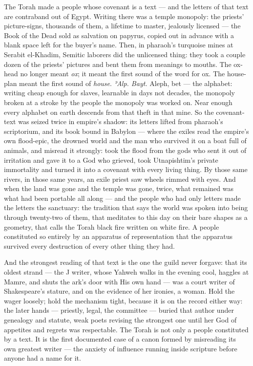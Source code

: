 The Torah made a people whose covenant is a text --- and the letters of
that text are contraband out of Egypt. Writing there was a temple
monopoly: the priests' picture-signs, thousands of them, a lifetime to
master, jealously licensed --- the Book of the Dead sold as salvation on
papyrus, copied out in advance with a blank space left for the buyer's
name. Then, in pharaoh's turquoise mines at Serabit el-Khadim, Semitic
laborers did the unlicensed thing: they took a couple dozen of the
priests' pictures and bent them from meanings to mouths. The ox-head no
longer meant \emph{ox}; it meant the first sound of the word for ox. The
house-plan meant the first sound of \emph{house}. \emph{ʾAlp. Bayt.}
Aleph, bet --- the alphabet: writing cheap enough for slaves, learnable
in days not decades, the monopoly broken at a stroke by the people the
monopoly was worked on. Near enough every alphabet on earth descends
from that theft in that mine. So the covenant-text was seized twice in
empire's shadow: its letters lifted from pharaoh's scriptorium, and its
book bound in Babylon --- where the exiles read the empire's own
flood-epic, the drowned world and the man who survived it on a boat full
of animals, and misread it strongly: took the flood from the gods who
sent it out of irritation and gave it to a God who grieved, took
Utnapishtim's private immortality and turned it into a covenant with
every living thing. By those same rivers, in those same years, an exile
priest saw wheels rimmed with eyes. And when the land was gone and the
temple was gone, twice, what remained was what had been portable all
along --- and the people who had only letters made the letters the
sanctuary: the tradition that says the world was spoken into being
through twenty-two of them, that meditates to this day on their bare
shapes as a geometry, that calls the Torah black fire written on white
fire. A people constituted so entirely by an apparatus of representation
that the apparatus survived every destruction of every other thing they
had.

And the strongest reading of that text is the one the guild never
forgave: that its oldest strand --- the J writer, whose Yahweh walks in
the evening cool, haggles at Mamre, and shuts the ark's door with His
own hand --- was a court writer of Shakespeare's stature, and on the
evidence of her ironies, a woman. Hold the wager loosely; hold the
mechanism tight, because it is on the record either way: the later hands
--- priestly, legal, the committee --- buried that author under
genealogy and statute, weak poets revising the strongest one until her
God of appetites and regrets was respectable. The Torah is not only a
people constituted by a text. It is the first documented case of a canon
formed by misreading its own greatest writer --- the anxiety of
influence running inside scripture before anyone had a name for it.

